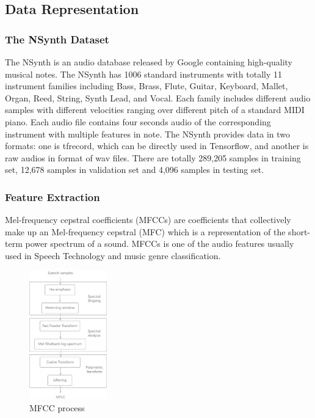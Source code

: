 \documentclass{article}
\begin{document}
\subsection{Data Representation}

\subsubsection{The NSynth Dataset}

The NSynth\cite{nsynth} is an audio database released by Google containing high-quality musical notes. The NSynth has 1006 standard instruments with totally 11 instrument families including Bass, Brass, Flute, Guitar, Keyboard, Mallet, Organ, Reed, String, Synth Lead, and Vocal. Each family includes different audio samples with different velocities ranging over different pitch of a standard MIDI piano. Each audio file contains four seconds audio of the corresponding instrument with multiple features in note. The NSynth provides data in two formats: one is tfrecord, which can be directly used in Tensorflow, and another is raw audios in format of wav files. There are totally 289,205 samples in training set, 12,678 samples in validation set and 4,096 samples in testing set. 

\subsubsection{Feature Extraction}

Mel-frequency cepstral coefficients (MFCCs) are coefficients that collectively make up an Mel-frequency cepstral (MFC) which is a representation of the short-term power spectrum of a sound.\cite{mfcc} MFCCs is one of the audio features usually used in Speech Technology and music genre classification. 

\begin{figure}[h!]
\centering
\includegraphics[width=0.3\textwidth]{mfcc-process.png}
\caption{MFCC process}
\label{fig:mfcc}
\end{figure}
\end{document}
